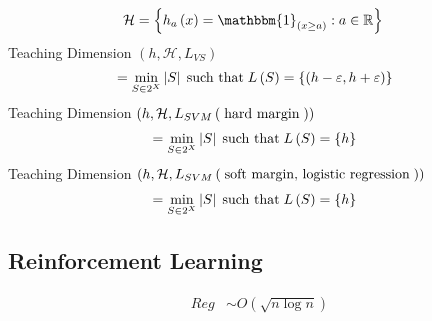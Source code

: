 \documentclass{article}
\begin{document}
\begin{align*}
\mathcal{H} &= \left\{h_{a}\left(x\right) = \mathbbm{1}_{\left(x \geq  a\right)} : a \in \mathbb{R}\right\}
\end{align*}
Teaching Dimension $\left(h , \mathcal{H}, L_{VS}\right)$
\begin{align*}
&= \displaystyle\min_{S \in 2^{X}} \left|  S  \right| \text{\;such that\;} L\left(S\right)  = \left\{\left(h - \varepsilon, h + \varepsilon\right)\right\}
\end{align*}
Teaching Dimension $\left(h , \mathcal{H}, L_{SVM} \left(\text{\;hard margin\;}\right)\right)$
\begin{align*}
&= \displaystyle\min_{S \in 2^{X}} \left|  S  \right| \text{\;such that\;} L\left(S\right)  = \left\{h \right\}
\end{align*}
Teaching Dimension $\left(h , \mathcal{H}, L_{SVM} \left(\text{\;soft margin, logistic regression\;}\right)\right)$
\begin{align*}
&= \displaystyle\min_{S \in 2^{X}} \left|  S  \right| \text{\;such that\;} L\left(S\right)  = \left\{h \right\}
\end{align*}

\subsection{Reinforcement Learning}
\begin{align*}
Reg  &\sim  O\left(\sqrt{n \log n}\right)
\end{align*}
\end{document}
